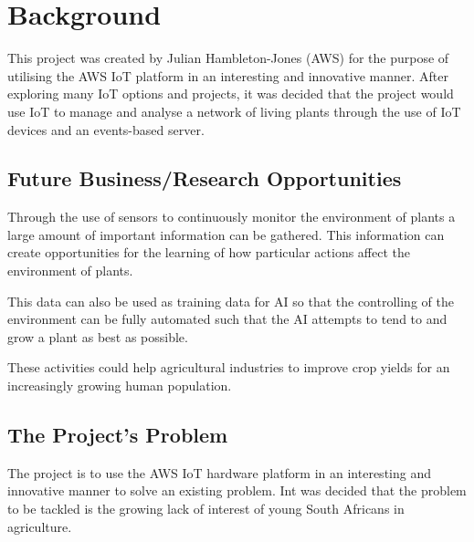 \documentclass{article}
\begin{document}
\section{Background}
	This project was created by Julian Hambleton-Jones (AWS) for the purpose of utilising the AWS IoT platform in an interesting and innovative manner. After exploring many IoT options and projects, it was decided that the project would use IoT to manage and analyse a network of living plants through the use of IoT devices and an events-based server.
	
\subsection{Future Business/Research Opportunities}
	Through the use of sensors to continuously monitor the environment of plants a large amount of important information can be gathered. This information can create opportunities for the learning of how particular actions affect the environment of plants.
	
	This data can also be used as training data for AI so that the controlling of the environment can be fully automated such that the AI attempts to tend to and grow a plant as best as possible.
	
	These activities could help agricultural industries to improve crop yields for an increasingly growing human population.

\subsection{The Project's Problem}
	The project is to use the AWS IoT hardware platform in an interesting and innovative manner to solve an existing problem. Int was decided that the problem to be tackled is the growing lack of interest of young South Africans in agriculture.
	
\end{document}
